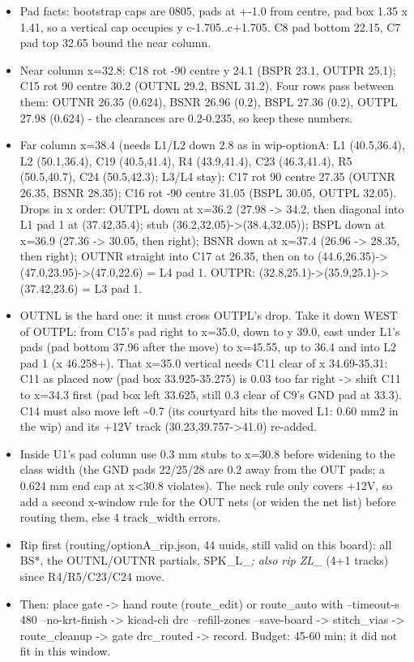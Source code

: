 \documentclass[11pt]{article}
\begin{document}
\begin{itemize}
\item Pad facts: bootstrap caps are 0805, pads at +-1.0 from centre, pad box 1.35 x 1.41, so a vertical
cap occupies y c-1.705..c+1.705. C8 pad bottom 22.15, C7 pad top 32.65 bound the near column.
\item Near column x=32.8: C18 rot -90 centre y 24.1 (BSPR 23.1, OUTPR 25.1); C15 rot 90 centre 30.2
(OUTNL 29.2, BSNL 31.2). Four rows pass between them: OUTNR 26.35 (0.624), BSNR 26.96 (0.2),
BSPL 27.36 (0.2), OUTPL 27.98 (0.624) - the clearances are 0.2-0.235, so keep these numbers.
\item Far column x=38.4 (needs L1/L2 down 2.8 as in wip-optionA: L1 (40.5,36.4), L2 (50.1,36.4), C19
(40.5,41.4), R4 (43.9,41.4), C23 (46.3,41.4), R5 (50.5,40.7), C24 (50.5,42.3); L3/L4 stay):
C17 rot 90 centre 27.35 (OUTNR 26.35, BSNR 28.35); C16 rot -90 centre 31.05 (BSPL 30.05,
OUTPL 32.05). Drops in x order: OUTPL down at x=36.2 (27.98 -\textgreater{} 34.2, then diagonal into L1 pad 1
at (37.42,35.4); stub (36.2,32.05)-\textgreater{}(38.4,32.05)); BSPL down at x=36.9 (27.36 -\textgreater{} 30.05, then right);
BSNR down at x=37.4 (26.96 -\textgreater{} 28.35, then right); OUTNR straight into C17 at 26.35, then on to
(44.6,26.35)-\textgreater{}(47.0,23.95)-\textgreater{}(47.0,22.6) = L4 pad 1. OUTPR: (32.8,25.1)-\textgreater{}(35.9,25.1)-\textgreater{}(37.42,23.6)
= L3 pad 1.
\item OUTNL is the hard one: it must cross OUTPL's drop. Take it down WEST of OUTPL: from C15's pad right
to x=35.0, down to y 39.0, east under L1's pads (pad bottom 37.96 after the move) to x=45.55, up to
36.4 and into L2 pad 1 (x 46.258+). That x=35.0 vertical needs C11 clear of x 34.69-35.31: C11 as
placed now (pad box 33.925-35.275) is 0.03 too far right -\textgreater{} shift C11 to x=34.3 first (pad box left
33.625, still 0.3 clear of C9's GND pad at 33.3). C14 must also move left \textasciitilde{}0.7 (its courtyard hits
the moved L1: 0.60 mm2 in the wip) and its +12V track (30.23,39.757-\textgreater{}41.0) re-added.
\item Inside U1's pad column use 0.3 mm stubs to x=30.8 before widening to the class width (the GND
pads 22/25/28 are 0.2 away from the OUT pads; a 0.624 mm end cap at x\textless{}30.8 violates). The neck
rule only covers +12V, so add a second x-window rule for the OUT nets (or widen the net list) before
routing them, else 4 track\_width errors.
\item Rip first (routing/optionA\_rip.json, 44 uuids, still valid on this board): all BS{*}, the OUTNL/OUTNR
partials, SPK\_L\_\emph{; also rip ZL\_} (4+1 tracks) since R4/R5/C23/C24 move.
\item Then: place gate -\textgreater{} hand route (route\_edit) or route\_auto with --timeout-s 480 --no-krt-finish -\textgreater{}
kicad-cli drc --refill-zones --save-board -\textgreater{} stitch\_vias -\textgreater{} route\_cleanup -\textgreater{} gate drc\_routed -\textgreater{}
record. Budget: 45-60 min; it did not fit in this window.
\end{itemize}
\end{document}
